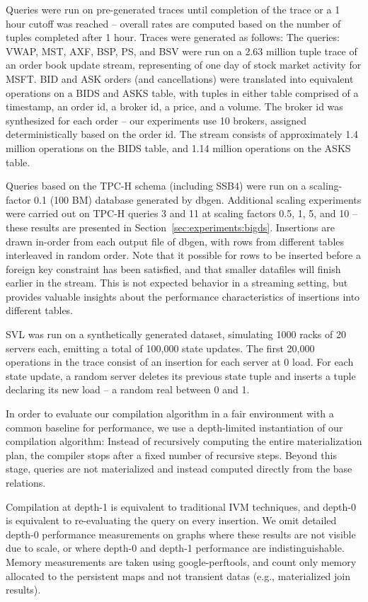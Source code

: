 Queries were run on pre-generated traces until completion of the trace or a 1 hour cutoff was reached -- overall rates are computed based on the number of tuples completed after 1 hour.  Traces were generated as follows: The queries: VWAP, MST, AXF, BSP, PS, and BSV were run on a 2.63 million tuple trace of an order book update stream, representing of one day of stock market activity for MSFT.  BID and ASK orders (and cancellations) were translated into equivalent operations on a BIDS and ASKS table, with tuples in either table comprised of a timestamp, an order id, a broker id, a price, and a volume.  The broker id was synthesized for each order -- our experiments use 10 brokers, assigned deterministically based on the order id.  The stream consists of approximately 1.4 million operations on the BIDS table, and 1.14 million operations on the ASKS table.

Queries based on the TPC-H schema (including SSB4) were run on a scaling-factor 0.1 (100 BM) database generated by dbgen\cite{tpch}.  Additional scaling experiments were carried out on TPC-H queries 3 and 11 at scaling factors 0.5, 1, 5, and 10 -- these results are presented in Section~\ref{sec:experiments:bigds}.  Insertions are drawn in-order from each output file of dbgen, with rows from different tables interleaved in random order.  Note that it possible for rows to be inserted before a foreign key constraint has been satisfied, and that smaller datafiles will finish earlier in the stream.  This is not expected behavior in a streaming setting, but provides valuable insights about the performance characteristics of insertions into different tables.

SVL was run on a synthetically generated dataset, simulating 1000 racks of 20 servers each, emitting a total of 100,000 state updates.  The first 20,000 operations in the trace consist of an insertion for each server at 0 load.  For each state update, a random server deletes its previous state tuple and inserts a tuple declaring its new load -- a random real between 0 and 1.

In order to evaluate our compilation algorithm in a fair environment with a common baseline for performance, we use a depth-limited instantiation of our compilation algorithm: Instead of recursively computing the entire materialization plan, the compiler stops after a fixed number of recursive steps.  Beyond this stage, queries are not materialized and instead computed directly from the base relations.

Compilation at depth-1 is equivalent to traditional IVM techniques, and depth-0 is equivalent to re-evaluating the query on every insertion.  We omit detailed depth-0 performance measurements on graphs where these results are not visible due to scale, or where depth-0 and depth-1 performance are indistinguishable.  Memory measurements are taken using google-perftools\cite{perftools}, and count only memory allocated to the persistent maps and not transient datas (e.g., materialized join results).

